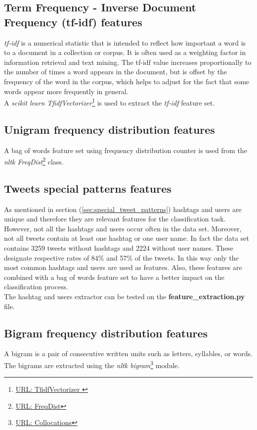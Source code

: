 \subsection{Term Frequency - Inverse Document Frequency (tf-idf) features}
\label{sec:tfidf}
\emph{tf-idf}\cite{website:tfidf} is a numerical statistic that is intended to reflect how important a word is to a document in a collection or corpus. It is often used as a weighting factor in information retrieval and text mining. The tf-idf value increases proportionally to the number of times a word appears in the document, but is offset by the frequency of the word in the corpus, which helps to adjust for the fact that some words appear more frequently in general.\\
A \emph{scikit learn TfidfVectorizer}\footnote{\href{http://scikit-learn.org/stable/modules/generated/sklearn.feature_extraction.text.TfidfVectorizer.html}{URL: TfidfVectorizer }} is used to extract the \emph{tf-idf} feature set.

\subsection{Unigram frequency distribution features}
\label{sec:fd}
A bag of words feature set using frequency distribution counter is used from the \emph{nltk FreqDist}\footnote{\href{http://www.cs.bgu.ac.il/~nlpproj/hocr/doc/project.external.nltk_probability.FreqDist-class.html}{URL: FreqDist}} class.

\subsection{Tweets special patterns features}
\label{sec:special_patterns}
As mentioned in section (\ref{sec:special_tweet_patterns}) hashtags and users are unique and therefore they are relevant features for the classification task. 
However, not all the hashtags and users occur often in the data set. 
Moreover, not all tweets contain at least one hashtag or one user name.
In fact the data set contains 3259 tweets without hashtags and 2224 without user names. These designate respective rates of 84\% and 57\% of the tweets.
In this way only the most common hashtags and users are used as features. Also, these features are combined with a bag of words feature set to have a better impact on the classification process.\\  
The hashtag and users extractor can be tested on the \textbf{feature\_extraction.py} file.

\subsection{Bigram frequency distribution features}
\label{sec:bigram}
A bigram is a pair of consecutive written units such as letters, syllables, or words.
The bigrams are extracted using the \emph{nltk bigram}\footnote{\href{http://www.nltk.org/_modules/nltk/collocations.html}{URL: Collocations}} module.
